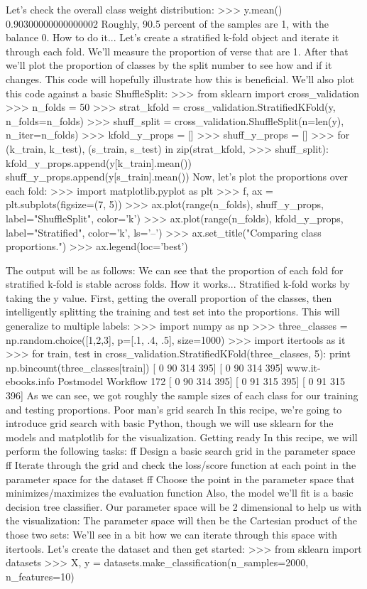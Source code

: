 Let's check the overall class weight distribution:
>>> y.mean()
0.90300000000000002
Roughly, 90.5 percent of the samples are 1, with the balance 0.
How to do it...
Let's create a stratified k-fold object and iterate it through each fold. We'll measure the
proportion of verse that are 1. After that we'll plot the proportion of classes by the split
number to see how and if it changes. This code will hopefully illustrate how this is beneficial.
We'll also plot this code against a basic ShuffleSplit:
>>> from sklearn import cross_validation
>>> n_folds = 50
>>> strat_kfold = cross_validation.StratifiedKFold(y,
n_folds=n_folds)
>>> shuff_split = cross_validation.ShuffleSplit(n=len(y),
n_iter=n_folds)
>>> kfold_y_props = []
>>> shuff_y_props = []
>>> for (k_train, k_test), (s_train, s_test) in zip(strat_kfold,
>>> shuff_split):
kfold_y_props.append(y[k_train].mean())
shuff_y_props.append(y[s_train].mean())
Now, let's plot the proportions over each fold:
>>> import matplotlib.pyplot as plt
>>> f, ax = plt.subplots(figsize=(7, 5))
>>> ax.plot(range(n_folds), shuff_y_props, label="ShuffleSplit",
color='k')
>>> ax.plot(range(n_folds), kfold_y_props, label="Stratified",
color='k', ls='--')
>>> ax.set_title("Comparing class proportions.")
>>> ax.legend(loc='best')

The output will be as follows:
We can see that the proportion of each fold for stratified k-fold is stable across folds.
How it works...
Stratified k-fold works by taking the y value. First, getting the overall proportion of the classes,
then intelligently splitting the training and test set into the proportions. This will generalize to
multiple labels:
>>> import numpy as np
>>> three_classes = np.random.choice([1,2,3], p=[.1, .4, .5],
size=1000)
>>> import itertools as it
>>> for train, test in cross_validation.StratifiedKFold(three_classes, 5):
print np.bincount(three_classes[train])
[ 0 90 314 395]
[ 0 90 314 395]
www.it-ebooks.info
Postmodel Workflow
172
[ 0 90 314 395]
[ 0 91 315 395]
[ 0 91 315 396]
As we can see, we got roughly the sample sizes of each class for our training and
testing proportions.
Poor man's grid search
In this recipe, we're going to introduce grid search with basic Python, though we will use
sklearn for the models and matplotlib for the visualization.
Getting ready
In this recipe, we will perform the following tasks:
ff Design a basic search grid in the parameter space
ff Iterate through the grid and check the loss/score function at each point
in the parameter space for the dataset
ff Choose the point in the parameter space that minimizes/maximizes the
evaluation function
Also, the model we'll fit is a basic decision tree classifier. Our parameter space will be 2
dimensional to help us with the visualization:
The parameter space will then be the Cartesian product of the those two sets:
We'll see in a bit how we can iterate through this space with itertools.
Let's create the dataset and then get started:
>>> from sklearn import datasets
>>> X, y = datasets.make_classification(n_samples=2000, n_features=10)

